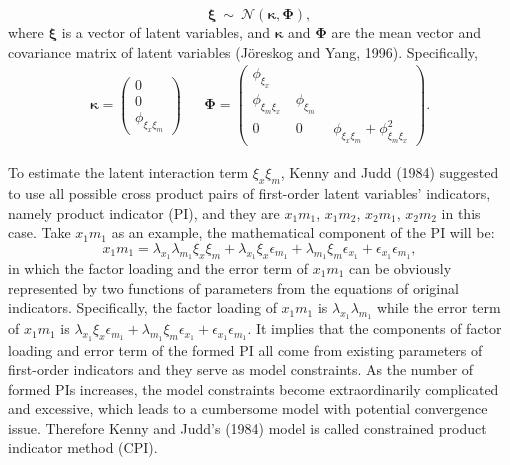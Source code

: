 \documentclass[
  man]{apa7}
\begin{document}
\begin{equation}
\boldsymbol{\xi} \ \sim \ \mathcal{N}(\boldsymbol{\kappa}, \boldsymbol{\Phi}), 
\end{equation}
where \(\boldsymbol{\xi}\) is a vector of latent variables, and \(\boldsymbol{\kappa}\) and \(\boldsymbol{\Phi}\) are the mean vector and covariance matrix of latent variables (Jöreskog and Yang, 1996). Specifically,
\begin{align}
  \boldsymbol{\kappa} = 
  \begin{pmatrix}
    0 \\
    0 \\
    \phi_{\xi_{x}\xi_{m}}
  \end{pmatrix} &&
  \boldsymbol{\Phi} = 
  \begin{pmatrix}
    \phi_{\xi_{x}} & \ & \ \\
    \phi_{\xi_{m}\xi_{x}} & \ \phi_{\xi_{m}} \ \\
    0 & \ 0 & \ \phi_{\xi_{x}\xi_{m}} + \phi_{\xi_{m}\xi_{x}}^2
  \end{pmatrix}.
\end{align}

To estimate the latent interaction term \(\xi_{x}\xi_{m}\), Kenny and Judd (1984) suggested to use all possible cross product pairs of first-order latent variables' indicators, namely product indicator (PI), and they are \(x_{1}m_{1}\), \(x_{1}m_{2}\), \(x_{2}m_{1}\), \(x_{2}m_{2}\) in this case. Take \(x_{1}m_{1}\) as an example, the mathematical component of the PI will be:
\begin{equation}
x_{1}m_{1} = \lambda_{x_{1}}\lambda_{m_{1}}\xi_{x}\xi_{m} + \lambda_{x_{1}}\xi_{x}\epsilon_{m_{1}} + \lambda_{m_{1}}\xi_{m}\epsilon_{x_{1}} + \epsilon_{x_{1}}\epsilon_{m_{1}},
\end{equation}
in which the factor loading and the error term of \(x_{1}m_{1}\) can be obviously represented by two functions of parameters from the equations of original indicators. Specifically, the factor loading of \(x_{1}m_{1}\) is \(\lambda_{x_{1}}\lambda_{m_{1}}\) while the error term of \(x_{1}m_{1}\) is \(\lambda_{x_{1}}\xi_{x}\epsilon_{m_{1}} + \lambda_{m_{1}}\xi_{m}\epsilon_{x_{1}} + \epsilon_{x_{1}}\epsilon_{m_{1}}\). It implies that the components of factor loading and error term of the formed PI all come from existing parameters of first-order indicators and they serve as model constraints. As the number of formed PIs increases, the model constraints become extraordinarily complicated and excessive, which leads to a cumbersome model with potential convergence issue. Therefore Kenny and Judd's (1984) model is called constrained product indicator method (CPI).
\end{document}
